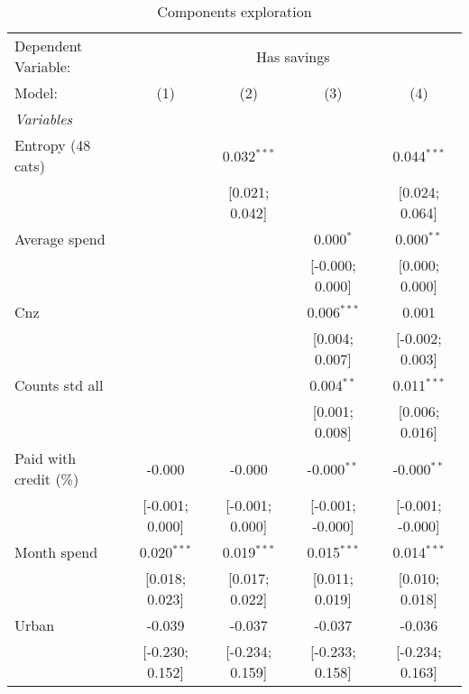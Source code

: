 \begin{table}[htbp]
   \centering
   \begin{threeparttable}[b]
      \caption{Components exploration}
      \begin{tabular}{lcccc}
         \tabularnewline \midrule \midrule
         Dependent Variable: & \multicolumn{4}{c}{Has savings}\\
         Model:                 & (1)             & (2)             & (3)              & (4)\\  
         \midrule
         \emph{Variables}\\
         Entropy (48 cats)      &                 & 0.032$^{***}$   &                  & 0.044$^{***}$\\   
                                &                 & [0.021; 0.042]  &                  & [0.024; 0.064]\\   
         Average spend          &                 &                 & 0.000$^{*}$      & 0.000$^{**}$\\   
                                &                 &                 & [-0.000; 0.000]  & [0.000; 0.000]\\   
         Cnz                    &                 &                 & 0.006$^{***}$    & 0.001\\   
                                &                 &                 & [0.004; 0.007]   & [-0.002; 0.003]\\   
         Counts std all         &                 &                 & 0.004$^{**}$     & 0.011$^{***}$\\   
                                &                 &                 & [0.001; 0.008]   & [0.006; 0.016]\\   
         Paid with credit (\%)  & -0.000          & -0.000          & -0.000$^{**}$    & -0.000$^{**}$\\   
                                & [-0.001; 0.000] & [-0.001; 0.000] & [-0.001; -0.000] & [-0.001; -0.000]\\   
         Month spend            & 0.020$^{***}$   & 0.019$^{***}$   & 0.015$^{***}$    & 0.014$^{***}$\\   
                                & [0.018; 0.023]  & [0.017; 0.022]  & [0.011; 0.019]   & [0.010; 0.018]\\   
         Urban                  & -0.039          & -0.037          & -0.037           & -0.036\\   
                                & [-0.230; 0.152] & [-0.234; 0.159] & [-0.233; 0.158]  & [-0.234; 0.163]\\   

\end{tabular}
\end{threeparttable}
\end{table}
